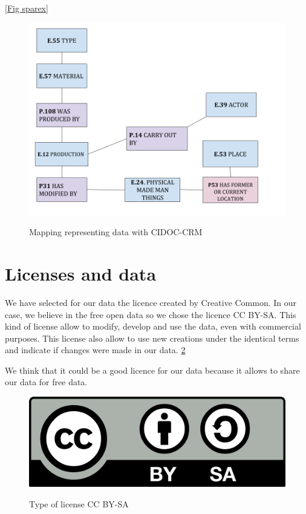 \documentclass[10pt,a4paper]{article}
\begin{document}
 \ref{Fig sparex}

\begin{figure}[hdp]
\centering
\includegraphics[scale=0.50]{sparex.png}
\label{sparex}
\caption{Mapping representing data with CIDOC-CRM}
\end{figure}


\section{Licenses and data}

We have selected for our data the licence created by Creative Common. In our case, we believe in the free open data so we chose the licence CC BY-SA. This kind of license allow to modify, develop and use the data, even with commercial purposes. This license also allow to use new creations under the identical terms and indicate if changes were made in our data. \ref{licence}

We think that it could be a good licence for our data because it allows to share our data for free data. 

\begin{figure}[hdp]
\centering
\includegraphics[scale=0.15]{licence.png}
\label{licence}
\caption{Type of license CC BY-SA}
\end{figure}
\end{document}

